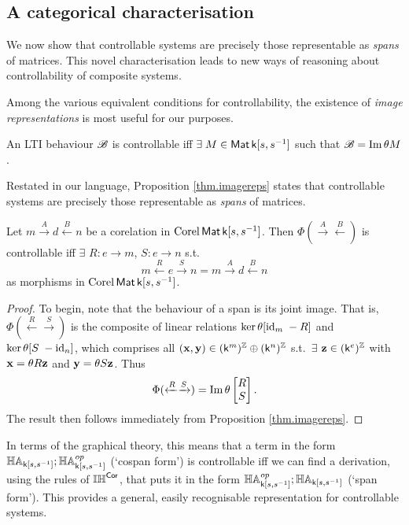 \subsection{A categorical characterisation}
We now show that controllable systems are precisely those representable as
\emph{spans} of matrices. This novel characterisation leads to new ways of
reasoning about controllability of composite systems. 

Among the various equivalent conditions for controllability, the existence of
\emph{image representations} is most useful for our purposes.
\begin{proposition} \label{thm.imagereps}
  An LTI behaviour ${\mathscr B}$ is controllable iff $\exists\; M \in \operatorname{\mathsf{Mat}}{\mathsf{k}[s,s^{-1}]}$ such that ${\mathscr B} = \mathrm{Im}\, \theta M$.
\end{proposition}

Restated in our language, Proposition \ref{thm.imagereps} states that controllable
systems are precisely those representable as \emph{spans} of matrices. 

\begin{theorem} \label{cor.spanreps}
  Let $m \xrightarrow{A} d \xleftarrow{B} n$ be a corelation in $\operatorname{{Corel}}\operatorname{\mathsf{Mat}}{\mathsf{k}[s,s^{-1}]}$. Then
  $\Phi(\xrightarrow{A}\xleftarrow{B})$ is controllable iff $\exists$ $R: e \to m$, $S: e\to n$ s.t.
  \[
    m \xleftarrow{R} e \xrightarrow{S} n = m \xrightarrow{A} d \xleftarrow{B} n
  \]
  as morphisms in $\operatorname{{Corel}}\operatorname{\mathsf{Mat}}{\mathsf{k}[s,s^{-1}]}$. 
\end{theorem}
\begin{proof}
  To begin, note that the behaviour of a span is its joint image. That is,
  $\Phi(\xleftarrow{R}\xrightarrow{S})$ is the composite of linear
  relations $\ker\theta[\mathrm{id}_m \; -R]$ and $\ker\theta[S\;
  -\mathrm{id}_n]$, which comprises all $(\mathbf{x},\mathbf{y}) \in (\mathsf{k}^m)^{\mathbb Z}
  \oplus (\mathsf{k}^n)^{\mathbb Z}$ s.t.\ $\exists$ $\mathbf{z} \in (\mathsf{k}^e)^{\mathbb Z}$ with
  $\mathbf{x} = \theta R \mathbf{z}$ and $\mathbf{y} = \theta S
  \mathbf{z}$. Thus
  \[
    \Phi(\xleftarrow{R}\xrightarrow{S}) = \mathrm{Im}\, \theta \left[
    \begin{matrix} R \\ S \end{matrix} \right].
  \]
  The result then follows immediately from Proposition \ref{thm.imagereps}.  
\end{proof}

In terms of the graphical theory, this means that a term in the 
form $\mathbb{HA}_{\mathsf{k}[s,s^{-1}]} ; \mathbb{HA}_{\mathsf{k}[s,s^{-1}]}^{op}$ (`cospan form') is controllable iff we can find a
derivation, using the rules of $\mathbb{IH}^{\mathsf{Cor}}$, that puts it in the form $\mathbb{HA}_{\mathsf{k}[s,s^{-1}]}^{op}
; \mathbb{HA}_{\mathsf{k}[s,s^{-1}]}$ (`span form').  This provides a general, easily recognisable
representation for controllable systems. 

